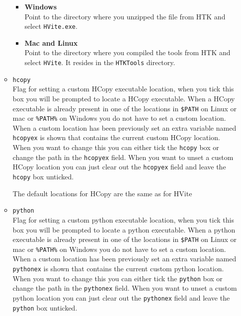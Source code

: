 \begin{itemize}
\begin{itemize}
				\begin{itemize}
					\item \textbf{Windows}\\
						Point to the directory where you unzipped the file
						from HTK and select \texttt{HVite.exe}.
					\item \textbf{Mac and Linux}\\
						Point to the directory where you compiled the tools from HTK and
						select \texttt{HVite}. It resides in the \texttt{HTKTools}
						directory.
				\end{itemize}
			\item \texttt{hcopy}\\
				Flag for setting a custom HCopy executable location, when you tick this
				box you will be prompted to locate a HCopy executable. When a HCopy
				executable is already present in one of the locations in
				\texttt{\$PATH} on Linux or mac or \texttt{\%PATH\%} on Windows you do
				not have to set a custom location. When a custom location has been
				previously set an extra variable named \texttt{hcopyex} is shown that
				contains the current custom HCopy location. When you want to change
				this you can either tick the \texttt{hcopy} box or change the path in
				the \texttt{hcopyex} field. When you want to unset a custom HCopy
				location you can just clear out the \texttt{hcopyex} field and leave
				the \texttt{hcopy} box unticked.

				The default locations for HCopy are the same as for HVite
			\item \texttt{python}\\
				Flag for setting a custom python executable location, when you tick
				this box you will be prompted to locate a python executable. When a
				python executable is already present in one of the locations in
				\texttt{\$PATH} on Linux or mac or \texttt{\%PATH\%} on Windows you do
				not have to set a custom location. When a custom location has been
				previously set an extra variable named \texttt{pythonex} is shown that
				contains the current custom python location. When you want to change
				this you can either tick the \texttt{python} box or change the path in
				the \texttt{pythonex} field. When you want to unset a custom python
				location you can just clear out the \texttt{pythonex} field and leave
				the \texttt{python} box unticked.


\end{itemize}
\end{itemize}
